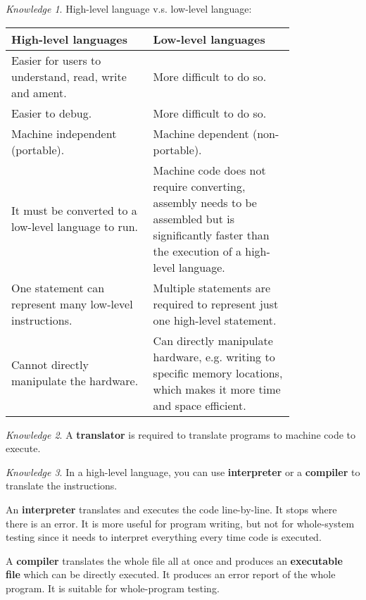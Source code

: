 \documentclass[8pt]{article}
\theoremstyle{remark}
\newtheorem{knowledge}{Knowledge}[subsection]
\begin{document}
            \begin{knowledge}
                High-level language v.s. low-level language:
                \begin{center}
                    \begin{tabular}{p{0.4\linewidth}|p{0.4\linewidth}}
                        High-level languages & Low-level languages\\\hline\hline
                        Easier for users to understand, read, write and ament. & More difficult to do so.\\\hline
                        Easier to debug. & More difficult to do so.\\\hline
                        Machine independent (portable). & Machine dependent (non-portable).\\\hline
                        It must be converted to a low-level language to run. & Machine code does not require converting, assembly needs to be assembled but is significantly faster than the execution of a high-level language.\\\hline
                        One statement can represent many low-level instructions. & Multiple statements are required to represent just one high-level statement.\\\hline
                        Cannot directly manipulate the hardware. & Can directly manipulate hardware, e.g. writing to specific memory locations, which makes it more time and space efficient.
                    \end{tabular}
                \end{center}
            \end{knowledge}

            \begin{knowledge}
                A \textbf{translator} is required to translate programs to machine code to execute.
            \end{knowledge}

            \begin{knowledge}
                In a high-level language, you can use \textbf{interpreter} or a \textbf{compiler} to translate the instructions.

                An \textbf{interpreter} translates and executes the code line-by-line. It stops where there is an error. It is more useful for program writing, but not for whole-system testing since it needs to interpret everything every time code is executed.

                A \textbf{compiler} translates the whole file all at once and produces an \textbf{executable file} which can be directly executed. It produces an error report of the whole program. It is suitable for whole-program testing.
            \end{knowledge}
\end{document}
